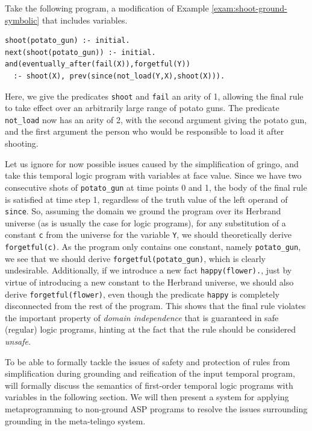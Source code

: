 \begin{example}\label{exam:shoot-nonground-unsafe}
  Take the following program, a modification of Example
  \ref{exam:shoot-ground-symbolic} that includes variables.
\begin{lstlisting}[language=clingo,numbers=none]
shoot(potato_gun) :- initial.
next(shoot(potato_gun)) :- initial.
and(eventually_after(fail(X)),forgetful(Y)) 
  :- shoot(X), prev(since(not_load(Y,X),shoot(X))).
\end{lstlisting}

Here, we give the predicates \verb|shoot| and \verb|fail| an arity of
1, allowing the final rule to take effect over an arbitrarily large
range of potato guns. The predicate \verb|not_load| now has an arity
of 2, with the second argument giving the potato gun, and the first
argument the person who would be responsible to load it after
shooting. 

Let us ignore for now possible issues caused by the simplification of
gringo, and take this temporal logic program with variables at face
value. Since we have two consecutive shots of \verb|potato_gun| at
time points 0 and 1, the body of the final rule is satisfied at time
step 1, regardless of the truth value of the left operand of
\verb|since|. So, assuming the domain we ground the program over its
Herbrand universe (as is usually the case for logic programs), for any
substitution of a constant \verb|c| from the universe for the variable
\verb|Y|, we should theoretically derive \verb|forgetful(c)|. As the
program only contains one constant, namely \verb|potato_gun|, we see
that we should derive \verb|forgetful(potato_gun)|, which is clearly
undesirable. Additionally, if we introduce a new fact
\verb|happy(flower).|, just by virtue of introducing a new constant to
the Herbrand universe, we should also derive \verb|forgetful(flower)|,
even though the predicate \verb|happy| is completely disconnected from
the rest of the program. This shows that the final rule violates the
important property of \textit{domain independence} that is guaranteed
in safe (regular) logic programs, hinting at the fact that the rule
should be considered \textit{unsafe}.
\end{example}

To be able to formally tackle the issues of safety and protection of
rules from simplification during grounding and reification of the
input temporal program, will formally discuss the semantics of
first-order temporal logic programs with variables in the following
section. We will then present a system for applying metaprogramming to
non-ground ASP programs to resolve the issues surrounding grounding in
the meta-telingo system.
